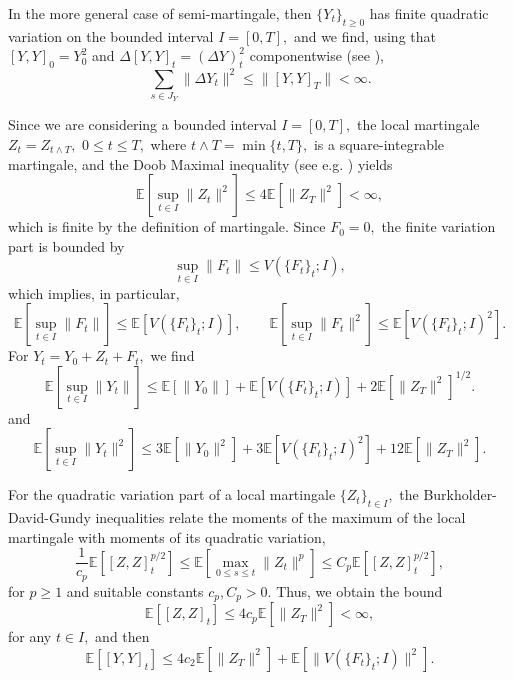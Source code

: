 \documentclass[reqno,12pt]{amsart}
\theoremstyle{plain} %
\theoremstyle{definition} %
\begin{document}
In the more general case of semi-martingale, then $\{Y_t\}_{t\geq 0}$ has finite quadratic variation \cite[Section II.6]{Protter2005} on the bounded interval $I=[0, T],$ and we find, using that $[Y, Y]_0 = Y_0^2$ and $\Delta [Y, Y]_t = (\Delta Y)_t^2$ componentwise (see \cite[Theorem II.22]{Protter2005}),
\begin{equation}
    \label{estimatejumpsemimartingale}
    \sum_{s\in J_{Y}} \|\Delta Y_t\|^2 \leq \|[Y, Y]_T\| < \infty.
\end{equation}

Since we are considering a bounded interval $I=[0, T],$ the local martingale $Z_t = Z_{t \land T},$ $0\leq t \leq T,$ where $t \land T = \min\{t, T\},$ is a square-integrable martingale, and the Doob Maximal inequality (see e.g. \cite[Theorem I.20]{Protter2005}) yields
\begin{equation}
    \label{expectationZtsquaredfinite}
    \mathbb{E}\left[\sup_{t\in I} \|Z_t\|^2\right] \leq 4\mathbb{E}[\|Z_T\|^2] < \infty,
\end{equation}
which is finite by the definition of martingale. Since $F_0 = 0,$ the finite variation part is bounded by
\[
    \sup_{t\in I} \|F_t\| \leq V(\{F_t\}_t; I),
\]
which implies, in particular,
\[
    \mathbb{E}\left[\sup_{t\in I} \|F_t\|\right] \leq \mathbb{E}\left[V(\{F_t\}_t; I)\right], \qquad \mathbb{E}\left[\sup_{t\in I} \|F_t\|^2\right] \leq \mathbb{E}\left[V(\{F_t\}_t; I)^2\right].
\]
For $Y_t = Y_0 + Z_t + F_t,$ we find
\begin{equation}
    \label{expectationYtfinite}
    \mathbb{E}\left[\sup_{t\in I} \|Y_t\|\right] \leq \mathbb{E}[\|Y_0\|] + \mathbb{E}\left[V(\{F_t\}_t; I)\right] + 2\mathbb{E}\left[\|Z_T\|^2\right]^{1/2}.
\end{equation}
and
\begin{equation}
    \label{expectationYtsquaredfinite}
    \mathbb{E}\left[\sup_{t\in I} \|Y_t\|^2\right] \leq 3\mathbb{E}[\|Y_0\|^2] + 3\mathbb{E}\left[V(\{F_t\}_t; I)^2\right] + 12\mathbb{E}[\|Z_T\|^2].
\end{equation}

For the quadratic variation part of a local martingale $\{Z_t\}_{t\in I},$ the Burkholder-David-Gundy inequalities \cite[Theorem IV.48]{Protter2005} relate the moments of the maximum of the local martingale with moments of its quadratic variation,
\[
    \frac{1}{c_p}\mathbb{E}\left[[Z, Z]_t^{p/2}\right] \leq \mathbb{E}\left[\max_{0\leq s \leq t} \|Z_t\|^p\right] \leq C_p\mathbb{E}\left[[Z, Z]_t^{p/2}\right],
\]
for $p \geq 1$ and suitable constants $c_p, C_p > 0.$ Thus, we obtain the bound
\[
    \mathbb{E}\left[[Z, Z]_t\right] \leq 4c_p\mathbb{E}\left[\|Z_T\|^2\right] < \infty,
\]
for any $t\in I,$ and then
\begin{equation}
    \label{expectationofquadraticvariation}
    \mathbb{E}\left[[Y, Y]_t\right] \leq 4c_2\mathbb{E}\left[\|Z_T\|^2\right] + \mathbb{E}\left[\|V(\{F_t\}_t; I)\|^2\right].
\end{equation}
\end{document}
